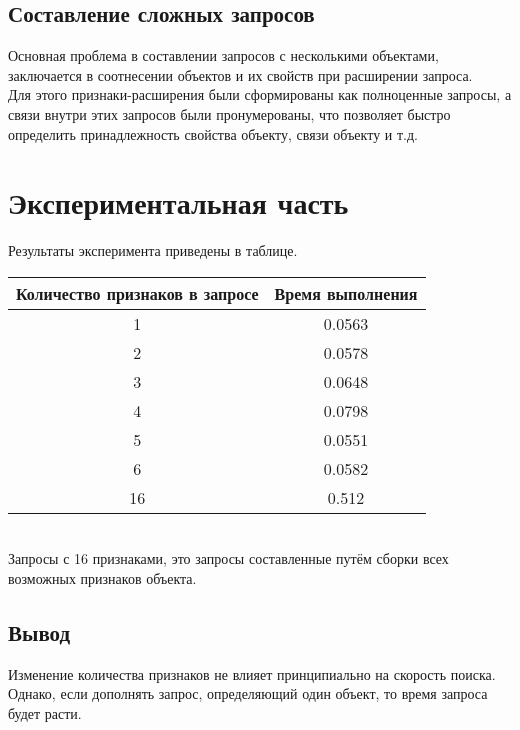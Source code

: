 \subsection{Составление сложных запросов}
Основная проблема в составлении запросов с несколькими объектами, заключается в соотнесении объектов и их свойств при расширении запроса.\\
Для этого признаки-расширения были сформированы как полноценные запросы, а связи внутри этих запросов были пронумерованы, что позволяет быстро определить принадлежность свойства объекту, связи объекту и т.д.
\section{Экспериментальная часть}
Результаты эксперимента приведены в таблице.\\
\begin{tabular}{|c|c|}
\hline
Количество признаков в запросе & Время выполнения\\
\hline
1 & 0.0563\\
2 & 0.0578\\ 
3 & 0.0648\\
4 & 0.0798\\
5 & 0.0551\\
6 & 0.0582\\
16 & 0.512\\
\hline
\end{tabular}
\\
Запросы с 16 признаками, это запросы составленные путём сборки всех возможных признаков объекта.
\subsection{Вывод}
Изменение количества признаков не влияет принципиально на скорость поиска. Однако, если дополнять запрос, определяющий один объект, то время запроса будет расти. 
